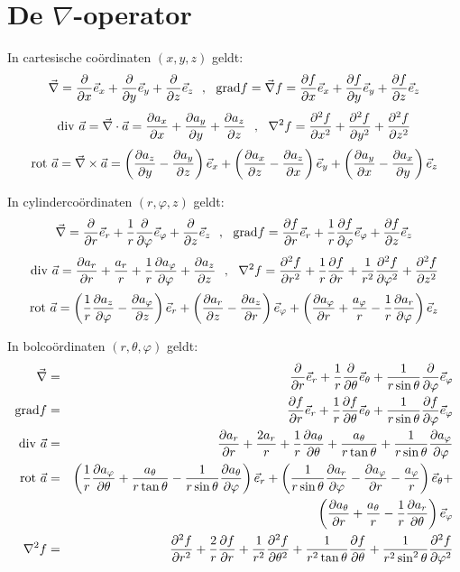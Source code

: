 \newpage
{}

\section*{De $\nabla$-operator}
In cartesische co\"ordinaten $(x,y,z)$ geldt:
\[
\vec{\nabla}=\Q{}{x}\ee{x}+\Q{}{y}\ee{y}+\Q{}{z}\ee{z}~~,~~
{\rm grad}f=\vec{\nabla}f=\Q{f}{x}\ee{x}+\Q{f}{y}\ee{y}+\Q{f}{z}\ee{z}
\]
\[
{\rm div}~\aaa=\vec{\nabla}\cdot\aaa=\Q{a_x}{x}+\Q{a_y}{y}+\Q{a_z}{z}~~,~~
\nabla^2 f=\QQ{f}{x}+\QQ{f}{y}+\QQ{f}{z}
\]
\[
{\rm rot}~\aaa=\vec{\nabla}\times\aaa=
               \left(\Q{a_z}{y}-\Q{a_y}{z}\right)\ee{x}+
               \left(\Q{a_x}{z}-\Q{a_z}{x}\right)\ee{y}+
               \left(\Q{a_y}{x}-\Q{a_x}{y}\right)\ee{z}
\]

In cylinderco\"ordinaten $(r,\varphi,z)$ geldt:
\[
\vec{\nabla}=\Q{}{r}\ee{r}+\frac{1}{r}\Q{}{\varphi}\ee{\varphi}+\Q{}{z}\ee{z}~~,~~
{\rm grad}f=\Q{f}{r}\ee{r}+\frac{1}{r}\Q{f}{\varphi}\ee{\varphi}+\Q{f}{z}\ee{z}
\]
\[
{\rm div}~\aaa=\Q{a_r}{r}+\frac{a_r}{r}+\frac{1}{r}\Q{a_\varphi}{\varphi}+\Q{a_z}{z}~~,~~
\nabla^2 f=\QQ{f}{r}+\frac{1}{r}\Q{f}{r}+\frac{1}{r^2}\QQ{f}{\varphi}+\QQ{f}{z}
\]
\[
{\rm rot}~\aaa=\left(\frac{1}{r}\Q{a_z}{\varphi}-\Q{a_\varphi}{z}\right)\ee{r}+
               \left(\Q{a_r}{z}-\Q{a_z}{r}\right)\ee{\varphi}+
               \left(\Q{a_\varphi}{r}+\frac{a_\varphi}{r}-\frac{1}{r}\Q{a_r}{\varphi}\right)\ee{z}\\
\]

In bolco\"ordinaten $(r,\theta,\varphi)$ geldt:
\begin{eqnarray*}
\vec{\nabla}  &=&\Q{}{r}\ee{r}+\frac{1}{r}\Q{}{\theta}\ee{\theta}+\frac{1}{r\sin\theta}\Q{}{\varphi}\ee{\varphi}\\
{\rm grad}f   &=&\Q{f}{r}\ee{r}+\frac{1}{r}\Q{f}{\theta}\ee{\theta}+\frac{1}{r\sin\theta}\Q{f}{\varphi}\ee{\varphi}\\
{\rm div}~\aaa&=&\Q{a_r}{r}+\frac{2a_r}{r}+\frac{1}{r}\Q{a_\theta}{\theta}+\frac{a_\theta}{r\tan\theta}+\frac{1}{r\sin\theta}\Q{a_\varphi}{\varphi}\\
{\rm rot}~\aaa&=&\left(\frac{1}{r}\Q{a_\varphi}{\theta}+\frac{a_\theta}{r\tan\theta}-\frac{1}{r\sin\theta}\Q{a_\theta}{\varphi}\right)\ee{r}+
                 \left(\frac{1}{r\sin\theta}\Q{a_r}{\varphi}-\Q{a_\varphi}{r}-\frac{a_\varphi}{r}\right)\ee{\theta}+\\
              &&\left(\Q{a_\theta}{r}+\frac{a_\theta}{r}-\frac{1}{r}\Q{a_r}{\theta}\right)\ee{\varphi}\\
\nabla^2 f    &=&\QQ{f}{r}+\frac{2}{r}\Q{f}{r}+\frac{1}{r^2}\QQ{f}{\theta}+\frac{1}{r^2\tan\theta}\Q{f}{\theta}+\frac{1}{r^2\sin^2\theta}\QQ{f}{\varphi}
\end{eqnarray*}

